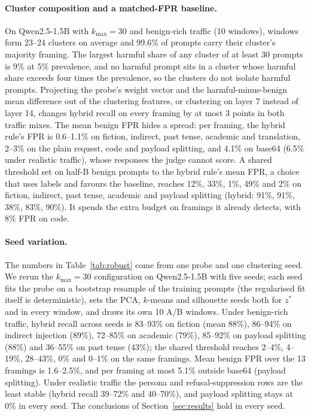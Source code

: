 \documentclass[11pt]{article}
\begin{document}
\begin{table}[t]
\centering
\resizebox{\columnwidth}{!}{}
\caption{Recall (\%) of the adaptive and hybrid rules on one framing as its harmful prevalence $\pi$ grows.}
\label{tab:flood}
\end{table}

\paragraph{Cluster composition and a matched-FPR baseline.}
On Qwen2.5-1.5B with $k_{\max}{=}30$ and benign-rich traffic (10 windows), windows form 23--24 clusters on average and 99.6\% of prompts carry their cluster's majority framing. The largest harmful share of any cluster of at least 30 prompts is 9\% at 5\% prevalence, and no harmful prompt sits in a cluster whose harmful share exceeds four times the prevalence, so the clusters do not isolate harmful prompts. Projecting the probe's weight vector and the harmful-minus-benign mean difference out of the clustering features, or clustering on layer 7 instead of layer 14, changes hybrid recall on every framing by at most 3 points in both traffic mixes. The mean benign FPR hides a spread: per framing, the hybrid rule's FPR is 0.6--1.1\% on fiction, indirect, past tense, academic and translation, 2--3\% on the plain request, code and payload splitting, and 4.1\% on base64 (6.5\% under realistic traffic), whose responses the judge cannot score. A shared threshold set on half-B benign prompts to the hybrid rule's mean FPR, a choice that uses labels and favours the baseline, reaches 12\%, 33\%, 1\%, 49\% and 2\% on fiction, indirect, past tense, academic and payload splitting (hybrid: 91\%, 91\%, 38\%, 83\%, 90\%). It spends the extra budget on framings it already detects, with 8\% FPR on code.

\paragraph{Seed variation.}
The numbers in Table~\ref{tab:robust} come from one probe and one clustering seed. We rerun the $k_{\max}{=}30$ configuration on Qwen2.5-1.5B with five seeds; each seed fits the probe on a bootstrap resample of the training prompts (the regularised fit itself is deterministic), sets the PCA, $k$-means and silhouette seeds both for $z^*$ and in every window, and draws its own 10 A/B windows. Under benign-rich traffic, hybrid recall across seeds is 83--93\% on fiction (mean 88\%), 86--94\% on indirect injection (89\%), 72--85\% on academic (79\%), 85--92\% on payload splitting (88\%) and 36--55\% on past tense (43\%); the shared threshold reaches 2--4\%, 4--19\%, 28--43\%, 0\% and 0--1\% on the same framings. Mean benign FPR over the 13 framings is 1.6--2.5\%, and per framing at most 5.1\% outside base64 (payload splitting). Under realistic traffic the persona and refusal-suppression rows are the least stable (hybrid recall 39--72\% and 40--70\%), and payload splitting stays at 0\% in every seed. The conclusions of Section~\ref{sec:results} hold in every seed.
\end{document}
